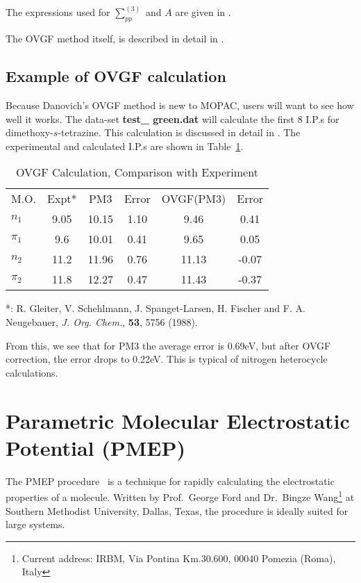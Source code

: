 The expressions used for $\sum_{pp}^{(3)}$ and $A$ are given in \cite{gf2}.

The OVGF method itself, is described in detail in \cite{gf1}.

\subsection{Example of OVGF calculation}
Because Danovich's OVGF method is new to MOPAC, users will want to see how well
it works.  The data-set {\bf test\_ green.dat} will calculate the first 8 I.P.s
for dimethoxy-$s$-tetrazine.  This calculation is discussed in detail in \cite{gf6}.
The experimental and calculated I.P.s are shown in Table~\ref{gftab}.
\begin{table}[hbt]
\caption{\label{gftab}OVGF Calculation, Comparison with Experiment}
\begin{center}
\begin{tabular}{lccccc}\\
M.O.     &  Expt*  &   PM3   & Error   &  OVGF(PM3)  &  Error \\
$n_1$    &  9.05   &   10.15 &  1.10   &   9.46      &   0.41 \\
$\pi_1$  &  9.6    &   10.01 &  0.41   &   9.65      &   0.05 \\
$n_2$    &  11.2   &   11.96 &  0.76   &  11.13      &  -0.07 \\
$\pi_2$  &  11.8   &   12.27 &  0.47   &  11.43      &  -0.37 \\
\end{tabular}

*: R. Gleiter,  V. Schehlmann, J. Spanget-Larsen, H. Fischer and F. A. Neugebauer,
{\em J. Org. Chem.}, {\bf 53}, 5756 (1988).
\end{center}
\end{table}


From this, we see that for PM3 the average error is 0.69eV, but after OVGF 
correction, the error drops to 0.22eV.  This is typical of nitrogen heterocycle 
calculations.

\section{Parametric Molecular Electrostatic Potential (PMEP)}

The PMEP procedure~\cite{pmep1,pmep2} is a technique for rapidly calculating 
the electrostatic
properties of a molecule.  Written by Prof.\ George Ford and Dr.\ Bingze 
Wang\footnote{Current address: IRBM, Via Pontina Km.30.600, 00040 Pomezia
(Roma), Italy}
at Southern Methodist University, Dallas, Texas, the procedure is ideally
suited for large systems.  

